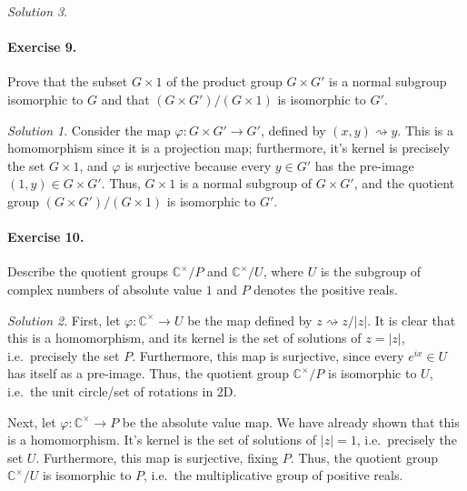 \documentclass[11pt]{report}
\def\C{\mathbb{C}}
\theoremstyle{remark}
\newtheorem*{solution}{Solution}
\begin{document}
\begin{solution}
    \paragraph{Exercise 9.} Prove that the subset $G \times 1$ of the product group
    $G \times G'$ is a normal subgroup isomorphic to $G$ and that $(G \times G') / (G
    \times 1)$ is isomorphic to $G'$.
    \begin{solution}
        Consider the map $\varphi\colon G \times G' \to G'$, defined by $(x, y)
        \rightsquigarrow y$. This is a homomorphism since it is a projection
        map; furthermore, it's kernel is precisely the set $G \times 1$, and
        $\varphi$ is surjective because every $y \in G'$ has the pre-image $(1, y)
        \in G\times G'$. Thus, $G \times 1$ is a normal subgroup of $G \times G'$,
        and the quotient group $(G \times G') / (G \times 1)$ is isomorphic to $G'$.
    \end{solution}

    \paragraph{Exercise 10.} Describe the quotient groups $\C^\times / P$ and
    $\C^\times / U$, where $U$ is the subgroup of complex numbers of absolute value
    $1$ and $P$ denotes the positive reals.
    \begin{solution}
        First, let $\varphi\colon \C^\times \to U$ be the map defined by $z
        \rightsquigarrow z / |z|$. It is clear that this is a homomorphism, and its
        kernel is the set of solutions of $z = |z|$, i.e.\ precisely the set $P$.
        Furthermore, this map is surjective, since every $e^{ix} \in U$ has itself as
        a pre-image. Thus, the quotient group $\C^\times / P$ is isomorphic to $U$,
        i.e.\ the unit circle/set of rotations in 2D.

        Next, let $\varphi\colon \C^\times \to P$ be the absolute value map. We have
        already shown that this is a homomorphism. It's kernel is the set of
        solutions of $|z|= 1$, i.e.\ precisely the set $U$. Furthermore, this map is
        surjective, fixing $P$. Thus, the quotient group $\C^\times / U$ is isomorphic
        to $P$, i.e.\ the multiplicative group of positive reals.
    \end{solution}


\end{solution}
\end{document}
